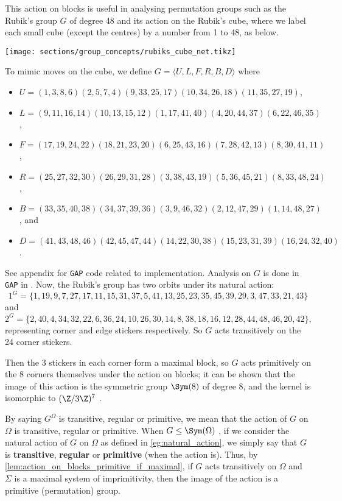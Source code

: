 \begin{example}\label{eg:rubiks_group}
    This action on blocks is useful in analysing permutation groups such as the Rubik's group $G$ of degree 48 and its action on the Rubik's cube, where we label each small cube (except the centres) by a number from 1 to 48, as below.

    \begin{center}
        \texttt{[image: sections/group\_concepts/rubiks\_cube\_net.tikz]}
    \end{center}

    To mimic moves on the cube, we define $G = \langle U,L,F,R,B,D \rangle$ where
    \begin{itemize}
        \item $U = ( 1, 3, 8, 6)( 2, 5, 7, 4)( 9,33,25,17)(10,34,26,18)(11,35,27,19)$,
        \item $L = ( 9,11,16,14)(10,13,15,12)( 1,17,41,40)( 4,20,44,37)( 6,22,46,35)$,
        \item $F = (17,19,24,22)(18,21,23,20)( 6,25,43,16)( 7,28,42,13)( 8,30,41,11)$,
        \item $R = (25,27,32,30)(26,29,31,28)( 3,38,43,19)( 5,36,45,21)( 8,33,48,24)$,
        \item $B = (33,35,40,38)(34,37,39,36)( 3, 9,46,32)( 2,12,47,29)( 1,14,48,27)$, and
        \item $D = (41,43,48,46)(42,45,47,44)(14,22,30,38)(15,23,31,39)(16,24,32,40)$.
    \end{itemize}

    See appendix for \texttt{GAP} code related to implementation. Analysis on $G$ is done in \texttt{GAP} in \cite{schonert_GAP}. Now, the Rubik's group has two orbits under its natural action:
    \[1^G = \{ 1, 19, 9, 7, 27, 17, 11, 15, 31, 37, 5, 41, 13, 25, 23, 35, 45, 39, 29, 3, 47, 33, 21, 43 \}\]
    and
    \[2^G = \{ 2, 40, 4, 34, 32, 22, 6, 36, 24, 10, 26, 30, 14, 8, 38, 18, 16, 12, 28, 44, 48, 46, 20, 42 \},\]
    representing corner and edge stickers respectively. So $G$ acts transitively on the 24 corner stickers.

    Then the 3 stickers in each corner form a maximal block, so $G$ acts primitively on the 8 corners themselves under the action on blocks; it can be shown that the image of this action is the symmetric group $\Sym(8)$ of degree 8, and the kernel is isomorphic to $(\Z/3\Z)^7$ \cite{schonert_GAP}.
\end{example}

By saying $G^\Omega$ is transitive, regular or primitive, we mean that the action of $G$ on $\Omega$ is transitive, regular or primitive. When $G \leq \Sym(\Omega)$ , if we consider the natural action of $G$ on $\Omega$ as defined in \autoref{eg:natural_action}, we simply say that $G$ is \textbf{transitive}, \textbf{regular} or \textbf{primitive} (when the action is). Thus, by \autoref{lem:action_on_blocks_primitive_if_maximal}, if $G$ acts transitively on $\Omega$ and $\Sigma$ is a maximal system of imprimitivity, then the image of the action is a primitive (permutation) group.

